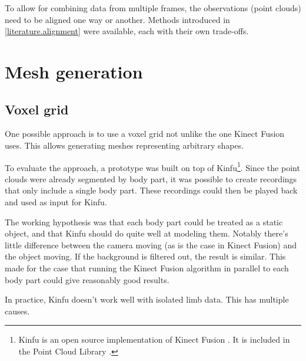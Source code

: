 To allow for combining data from multiple frames, the observations (point clouds) need to be aligned one way or another. Methods introduced in \autoref{literature.alignment} were available, each with their own trade-offs.


\section{Mesh generation}


\subsection{Voxel grid}

One possible approach is to use a voxel grid not unlike the one Kinect Fusion \citep{} uses. This allows generating meshes representing arbitrary shapes.

To evaluate the approach, a prototype was built on top of Kinfu\footnote{Kinfu is an open source implementation of Kinect Fusion \citep{newcombe2011kinectfusion}. It is included in the Point Cloud Library \citep{PCL}.}. Since the point clouds were already segmented by body part, it was possible to create recordings that only include a single body part. These recordings could then be played back and used as input for Kinfu.

The working hypothesis was that each body part could be treated as a static object, and that Kinfu should do quite well at modeling them. Notably there's little difference between the camera moving (as is the case in Kinect Fusion) and the object moving. If the background is filtered out, the result is similar. This made for the case that running the Kinect Fusion algorithm in parallel to each body part could give reasonably good results.

In practice, Kinfu doesn't work well with isolated limb data. This has multiple causes. 

